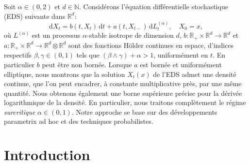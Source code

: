 \documentclass[JEP,XML,SOM,Unicode,published]{cedram}
\theoremstyle{plain}
\theoremstyle{definition}
\newcommand\1{{\mathbf{1}}}
\begin{document}




\begin{altabstract}
Soit $\alpha\in(0,2)$ et $d\in{\mathbb N}$. Considérons l'équation différentielle stochastique (EDS) suivante dans ${\mathbb R}^d$:
\[
\mathrm{d} X_t=b(t,X_t)\,\mathrm{d} t+a(t,X_{t-})\,\mathrm{d} L^{(\alpha)}_t,\quad X_0=x,
\]
où $L^{(\alpha)}$ est un processus $\alpha$-stable isotrope de dimension $d$, $b:{\mathbb R}_+\times{\mathbb R}^d\to{\mathbb R}^d$ et $a:{\mathbb R}_+\times{\mathbb R}^d\to{\mathbb R}^d\otimes{\mathbb R}^d$ sont des fonctions Hölder continues en espace, d'indices respectifs $\beta,\gamma\in (0,1)$ tels que $(\beta\wedge \gamma)+\alpha>1$, uniformément en $t$. En particulier $b$ peut être non bornée. Lorsque $a$ est bornée et uniformément elliptique, nous montrons que la solution $X_t(x)$ de l'EDS admet une densité continue, que l'on peut encadrer, à constante multiplicative près, par une même quantité. Nous obtenons également une borne supérieure précise pour la dérivée logarithmique de la densité. En particulier, nous traitons complètement le régime \emph{surcritique} $\alpha\in (0,1)$. Notre approche se base sur des développements parametrix ad hoc et des techniques probabilistes.
\end{altabstract}

\maketitle
\vspace*{-\baselineskip}
\tableofcontents
\mainmatter

\section{Introduction}
\end{document}
